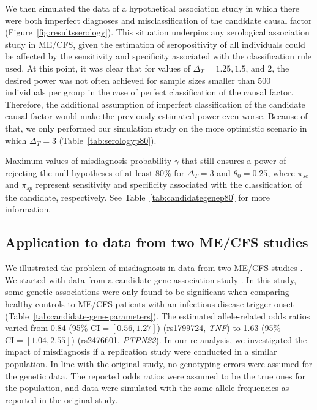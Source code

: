We then simulated the data of a hypothetical association study in which there were both imperfect diagnoses and misclassification of the candidate causal factor (Figure~\ref{fig:resultsserology}). This situation underpins any serological association study in ME/CFS, given the estimation of seropositivity of all individuals could be affected by the sensitivity and specificity associated with the classification rule used. At this point, it was clear that for values of $\Delta_T = 1.25, 1.5$, and 2, the desired power was not often achieved for sample sizes smaller than 500 individuals per group in the case of perfect classification of the causal factor. Therefore, the additional assumption of imperfect classification of the candidate causal factor would make the previously estimated power even worse. Because of that, we only performed our simulation study on the more optimistic scenario in which $\Delta_T = 3$ (Table~\ref{tab:serologyp80}).

\begin{table}
    \centering
    \caption[Maximum values of misdiagnosis probability that still ensures a power of rejecting the null hypotheses of at least 80\% for $\Delta_T = 3$ and $\theta_0 = 0.25$]{Maximum values of misdiagnosis probability $\gamma$ that still ensures a power of rejecting the null hypotheses of at least 80\% for $\Delta_T = 3$ and $\theta_0 = 0.25$, where $\pi_{se}$ and $\pi_{sp}$ represent sensitivity and specificity associated with the classification of the candidate, respectively. See Table~\ref{tab:candidategenep80} for more information.}
    
    \label{tab:serologyp80}
\end{table}

\subsection{Application to data from two ME/CFS studies}

We illustrated the problem of misdiagnosis in data from two ME/CFS studies \citep{cliff2019CellularImmune, steiner2020AutoimmunityRelatedRisk}. We started with data from a candidate gene association study \citep{steiner2020AutoimmunityRelatedRisk}. In this study, some genetic associations were only found to be significant when comparing healthy controls to ME/CFS patients with an infectious disease trigger onset (Table~\ref{tab:candidate-gene-parameters}). The estimated allele-related odds ratios varied from 0.84 (95\% $\text{CI} = [0.56, 1.27]$) (rs1799724, \textit{TNF}) to 1.63 (95\% $\text{CI} = [1.04, 2.55]$) (rs2476601, \textit{PTPN22}). In our re-analysis, we investigated the impact of misdiagnosis if a replication study were conducted in a similar population. In line with the original study, no genotyping errors were assumed for the genetic data. The reported odds ratios were assumed to be the true ones for the population, and data were simulated with the same allele frequencies as reported in the original study.

